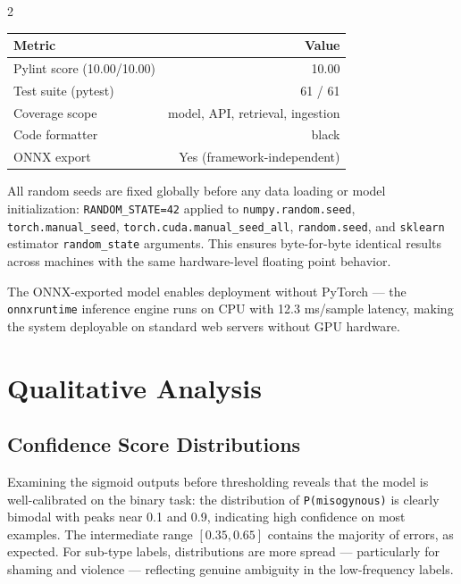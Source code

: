 \documentclass[11pt]{article}
\begin{document}
\begin{multicols}{2}
\begin{center}
\small
\begin{tabular}{lr}
\toprule
\textbf{Metric} & \textbf{Value} \\
\midrule
Pylint score (10.00/10.00) & 10.00 \\
Test suite (pytest)        & 61 / 61 \\
Coverage scope             & model, API, retrieval, ingestion \\
Code formatter             & black \\
ONNX export                & Yes (framework-independent) \\
\bottomrule
\end{tabular}
\end{center}

All random seeds are fixed globally before any data loading or model initialization: \texttt{RANDOM\_STATE=42} applied to \texttt{numpy.random.seed}, \texttt{torch.manual\_seed}, \texttt{torch.cuda.manual\_seed\_all}, \texttt{random.seed}, and \texttt{sklearn} estimator \texttt{random\_state} arguments. This ensures byte-for-byte identical results across machines with the same hardware-level floating point behavior.

The ONNX-exported model enables deployment without PyTorch — the \texttt{onnxruntime} inference engine runs on CPU with 12.3 ms/sample latency, making the system deployable on standard web servers without GPU hardware.

\section{Qualitative Analysis}

\subsection{Confidence Score Distributions}

Examining the sigmoid outputs before thresholding reveals that the model is well-calibrated on the binary task: the distribution of \texttt{P(misogynous)} is clearly bimodal with peaks near 0.1 and 0.9, indicating high confidence on most examples. The intermediate range $[0.35, 0.65]$ contains the majority of errors, as expected. For sub-type labels, distributions are more spread — particularly for shaming and violence — reflecting genuine ambiguity in the low-frequency labels.


\end{multicols}
\end{document}
